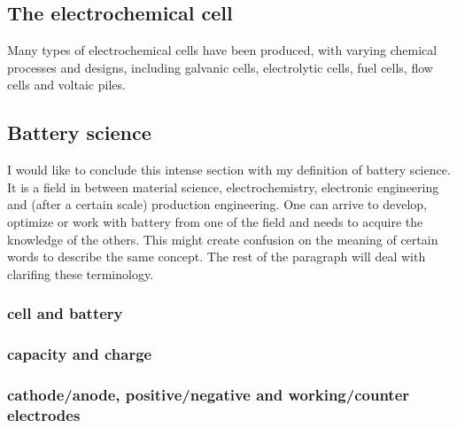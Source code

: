 \subsection{The electrochemical cell}
Many types of electrochemical cells have been produced, with varying chemical processes and designs, including galvanic cells, electrolytic cells, fuel cells, flow cells and voltaic piles.

\subsection{Battery science}
I would like to conclude this intense section with my definition of battery science. It is a field in between material science, electrochemistry, electronic engineering and (after a certain scale) production engineering. One can arrive to develop, optimize or work with battery from one of the field and needs to acquire the knowledge of the others. This might create confusion on the meaning of certain words to describe the same concept. The rest of the paragraph will deal with clarifing these terminology.
\subsubsection{cell and battery}
\subsubsection{capacity and charge}
\subsubsection{cathode/anode, positive/negative and working/counter electrodes}


